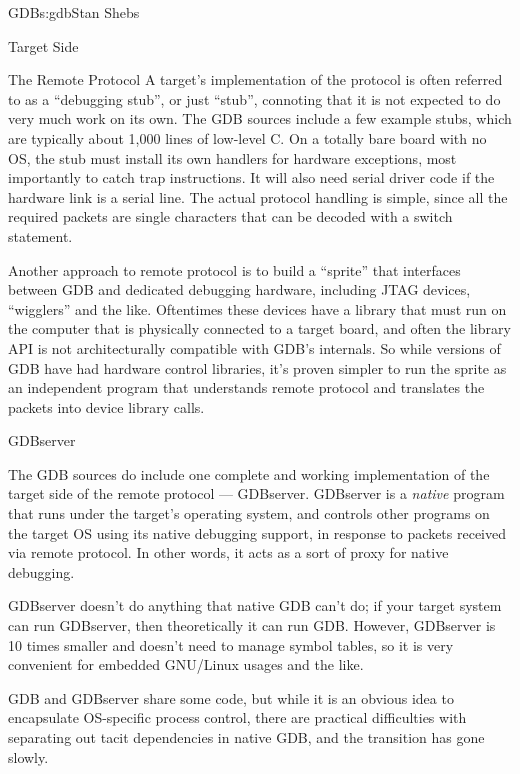 \begin{aosachapter}{GDB}{s:gdb}{Stan Shebs}
\begin{aosasect1}{Target Side}
\begin{aosasect2}{The Remote Protocol}
A target's implementation of the protocol is often referred to as a
``debugging stub'', or just ``stub'', connoting that it is not expected
to do very much work on its own.  The GDB sources include a few
example stubs, which are typically about 1,000 lines of low-level C.
On a totally bare board with no OS, the stub must install its own
handlers for hardware exceptions, most importantly to catch trap
instructions.  It will also need serial driver code if the hardware
link is a serial line.  The actual protocol handling is simple, since
all the required packets are single characters that can be decoded
with a switch statement.

Another approach to remote protocol is to build a ``sprite'' that
interfaces between GDB and dedicated debugging hardware, including
JTAG devices, ``wigglers'' and the like.  Oftentimes these devices
have a library that must run on the computer that is physically
connected to a target board, and often the library API is not
architecturally compatible with GDB's internals.  So while versions of
GDB have had hardware control libraries, it's proven simpler to run
the sprite as an independent program that understands remote protocol
and translates the packets into device library calls.

\end{aosasect2}

\begin{aosasect2}{GDBserver}

The GDB sources do include one complete and working implementation of
the target side of the remote protocol --- GDBserver.  GDBserver is a
{\em native} program that runs under the target's operating system,
and controls other programs on the target OS using its native
debugging support, in response to packets received via remote protocol.
In other words, it acts as a sort of proxy for native debugging.

GDBserver doesn't do anything that native GDB can't do; if your target
system can run GDBserver, then theoretically it can run GDB.  However,
GDBserver is 10 times smaller and doesn't need to manage symbol
tables, so it is very convenient for embedded GNU/Linux usages and the
like.


GDB and GDBserver share some code, but while it is an obvious idea to
encapsulate OS-specific process control, there are practical difficulties
with separating out tacit dependencies in native GDB, and the transition
has gone slowly.


\end{aosasect2}
\end{aosasect1}
\end{aosachapter}

